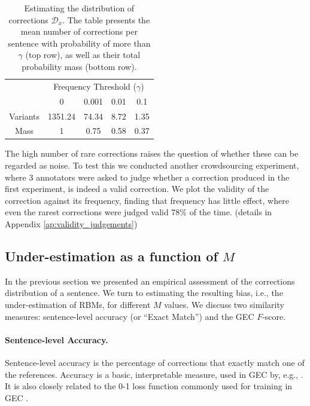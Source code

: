 \documentclass[letterpaper, 11pt]{article}
\begin{document}
\begin{table}[h!]
	\vspace{-0.5cm}
  \centering
  \small
  \singlespacing
  \begin{tabular}{c|c|c|c|c|}
    & \multicolumn{4}{c|}{Frequency Threshold ($\gamma$)}\\ 
    & \multicolumn{1}{c}{0} & \multicolumn{1}{c}{0.001} & \multicolumn{1}{c}{0.01} & \multicolumn{1}{c|}{0.1}
    \\
    \hline
    Variants & 1351.24 & 74.34 & 8.72 & 1.35
    \\
    Mass & 1 & 0.75 & 0.58 & 0.37\\
    \hline
  \end{tabular}
  \caption{\label{tab:corrections_dist}
    Estimating the distribution of corrections $\mathcal{D}_x$.
    The table presents the mean number of corrections per sentence with probability of more than
    $\gamma$ (top row), as well as their total probability mass (bottom row).
  }
  \vspace{-0.3cm}
\end{table}

The high number of rare corrections raises the question of whether these can be regarded as noise.
To test this we conducted another crowdsourcing experiment, where 3 annotators were asked to judge whether a correction produced in the first experiment, is indeed a valid correction.
We plot the validity of the correction against its frequency, finding that frequency has little effect,
where even the rarest corrections were judged valid 78\% of the time.
(details in Appendix \ref{ap:validity_judgements})

\subsection{Under-estimation as a function of $M$} \label{subsec:Assessment-values}
In the previous section we presented an empirical assessment of the corrections distribution of a sentence. We turn to estimating the resulting bias, i.e., the under-estimation of RBMs, for different $M$ values. 
We discuss two similarity measures: sentence-level accuracy
(or ``Exact Match'') and the GEC $F$-score.

\paragraph{Sentence-level Accuracy.}
Sentence-level accuracy is the percentage of corrections that
exactly match one of the references.
Accuracy is a basic, interpretable measure, used in GEC by, e.g., .
It is also closely related to the 0-1 loss function commonly used
for training in GEC \cite{chodorow2012problems,rozovskaya2013joint}. 
\end{document}
